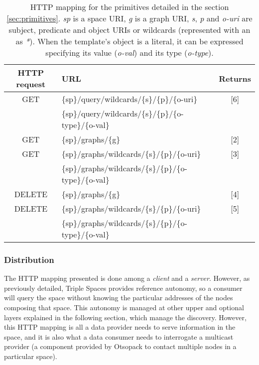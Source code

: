 \begin{table} %
\centering
\caption {HTTP mapping for the primitives detailed in the section \ref{sec:primitives}. \textit{sp} is a
space URI, \textit{g} is a graph URI, \textit{s}, \textit{p} and \textit{o-uri} are subject, predicate and object URIs
or wildcards (represented with an as \textit{*}). When the template's object is a literal, it can be expressed
specifying its value (\textit{o-val}) and its type (\textit{o-type}).}
\begin{tabular}{|c|l|c|}
\hline
HTTP request & URL & Returns \\
\hline \hline
GET & \{sp\}/query/wildcards/\{s\}/\{p\}/\{o-uri\} &  [6] \\
 & \{sp\}/query/wildcards/\{s\}/\{p\}/\{o-type\}/\{o-val\} & \\
GET & \{sp\}/graphs/\{g\} & [2] \\
GET & \{sp\}/graphs/wildcards/\{s\}/\{p\}/\{o-uri\} & [3] \\
 & \{sp\}/graphs/wildcards/\{s\}/\{p\}/\{o-type\}/\{o-val\} & \\
DELETE & \{sp\}/graphs/\{g\} & [4] \\
DELETE & \{sp\}/graphs/wildcards/\{s\}/\{p\}/\{o-uri\} & [5] \\
 & \{sp\}/graphs/wildcards/\{s\}/\{p\}/\{o-type\}/\{o-val\} & \\
\hline
\end{tabular}
\label{tab:otsopackAPI}
\end{table}


\subsubsection{Distribution}

The HTTP mapping presented is done among a \textit{client} and a \textit{server}.
However, as previously detailed, Triple Spaces provides reference autonomy, so a consumer will query the space without knowing the particular addresses of the nodes composing that space.
This autonomy is managed at other upper and optional layers explained in the following section, which manage the discovery.
However, this HTTP mapping is all a data provider needs to serve information in the space, and it is also what a data consumer needs to interrogate a multicast provider (a component provided by Otsopack to contact multiple nodes in a particular space).

